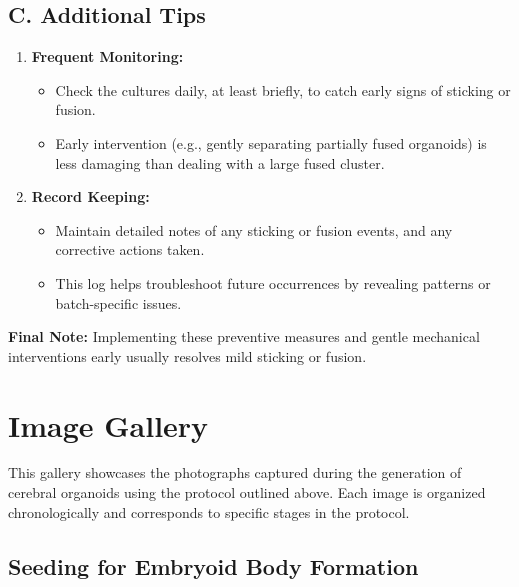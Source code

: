 \documentclass[11pt]{article}
\begin{document}
\subsection{C. Additional Tips}

\begin{enumerate}[leftmargin=*]
    \item \textbf{Frequent Monitoring:}
    \begin{itemize}[leftmargin=*]
        \item Check the cultures daily, at least briefly, to catch early signs of sticking or fusion.
        \item Early intervention (e.g., gently separating partially fused organoids) is less damaging than dealing with a large fused cluster.
    \end{itemize}

    \item \textbf{Record Keeping:}
    \begin{itemize}[leftmargin=*]
        \item Maintain detailed notes of any sticking or fusion events, and any corrective actions taken.
        \item This log helps troubleshoot future occurrences by revealing patterns or batch-specific issues.
    \end{itemize}

\end{enumerate}

\noindent
\textbf{Final Note:} Implementing these preventive measures and gentle mechanical interventions early usually resolves mild sticking or fusion.

\section{Image Gallery}

This gallery showcases the photographs captured during the generation of cerebral organoids using the protocol outlined above. Each image is organized chronologically and corresponds to specific stages in the protocol.

\subsection{Seeding for Embryoid Body Formation}
\end{document}
